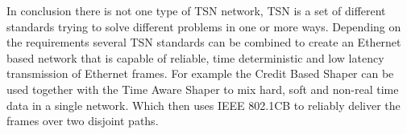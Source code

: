In conclusion there is not one type of TSN network, TSN is a set of different standards trying to solve different problems in one or more ways. Depending on the requirements several TSN standards can be combined to create an Ethernet based network that is capable of reliable, time deterministic and low latency transmission of Ethernet frames. For example the Credit Based Shaper can be used together with the Time Aware Shaper to mix hard, soft and non-real time data in a single network. Which then uses IEEE 802.1CB to reliably deliver the frames over two disjoint paths.